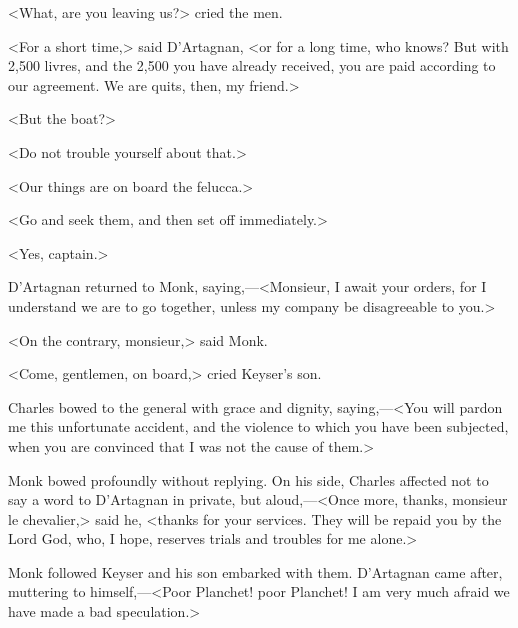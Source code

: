 <What, are you leaving us?> cried the men.

<For a short time,> said D'Artagnan, <or for a long time, who knows? But with 2,500 livres, and the 2,500 you have already received, you are paid according to our agreement. We are quits, then, my friend.>

<But the boat?>

<Do not trouble yourself about that.>

<Our things are on board the felucca.>

<Go and seek them, and then set off immediately.>

<Yes, captain.>

D'Artagnan returned to Monk, saying,—<Monsieur, I await your orders, for I understand we are to go together, unless my company be disagreeable to you.>

<On the contrary, monsieur,> said Monk.

<Come, gentlemen, on board,> cried Keyser's son.

Charles bowed to the general with grace and dignity, saying,—<You will pardon me this unfortunate accident, and the violence to which you have been subjected, when you are convinced that I was not the cause of them.>

Monk bowed profoundly without replying. On his side, Charles affected not to say a word to D'Artagnan in private, but aloud,—<Once more, thanks, monsieur le chevalier,> said he, <thanks for your services. They will be repaid you by the Lord God, who, I hope, reserves trials and troubles for me alone.>

Monk followed Keyser and his son embarked with them. D'Artagnan came after, muttering to himself,—<Poor Planchet! poor Planchet! I am very much afraid we have made a bad speculation.> 